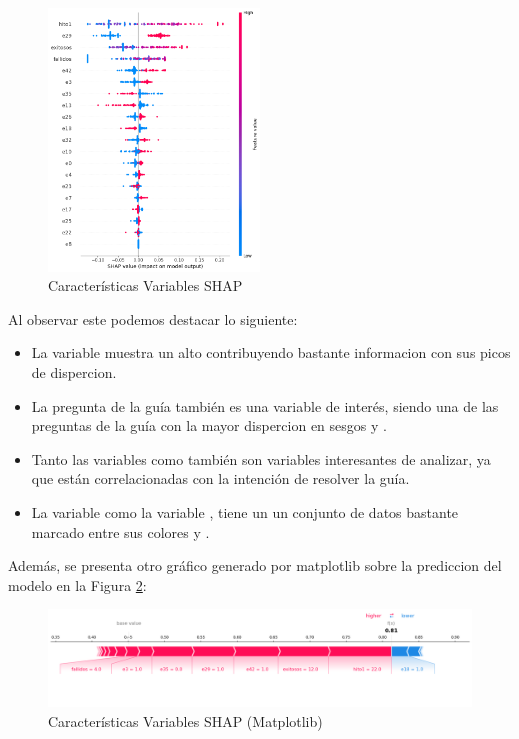 \begin{figure}[H]
    \centering
    \includegraphics[width=0.5\textwidth]{img/shap_rf/shapForcePlot2.png}
    \caption{Características Variables SHAP}
    \label{fig:caract_var_shap}
\end{figure}

Al observar este podemos destacar lo siguiente:

\begin{itemize}
    \item La variable   muestra un alto  contribuyendo bastante informacion con sus picos de dispercion.
    \item La pregunta de la guía  también es una variable de interés, siendo una de las preguntas de la guía con la mayor dispercion en sesgos  y .
    \item Tanto las variables  como  también son variables interesantes de analizar, ya que están correlacionadas con la intención de resolver la guía.
    \item La variable  como la variable , tiene un un conjunto de datos bastante marcado entre  sus colores  y .
\end{itemize}

Además, se presenta otro gráfico generado por matplotlib sobre la prediccion del modelo en la Figura \ref{fig:caract_var_shap_mat}:

\begin{figure}[H]
    \centering
    \includegraphics[width=1\textwidth]{img/shap_rf/shapForcePlot.png}
    \caption{Características Variables SHAP (Matplotlib)}
    \label{fig:caract_var_shap_mat}
\end{figure}

